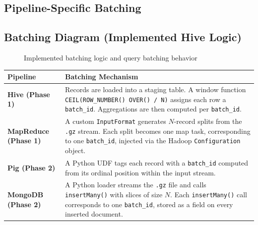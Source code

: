 \documentclass[12pt,a4paper]{article}
\begin{document}
\subsection{Pipeline-Specific Batching}
\subsection{Batching Diagram (Implemented Hive Logic)}
\begin{figure}[H]
\centering
{}
\caption{Implemented batching logic and query batching behavior}
\end{figure}

\begin{center}
\begin{tabularx}{\textwidth}{lX}
\toprule
\textbf{Pipeline} & \textbf{Batching Mechanism} \\
\midrule
\textbf{Hive (Phase 1)} & Records are loaded into a staging table. A window function \texttt{CEIL(ROW\_NUMBER() OVER() / N)} assigns each row a \texttt{batch\_id}. Aggregations are then computed per \texttt{batch\_id}. \\
\addlinespace
\textbf{MapReduce (Phase 1)} & A custom \texttt{InputFormat} generates $N$-record splits from the \texttt{.gz} stream. Each split becomes one map task, corresponding to one \texttt{batch\_id}, injected via the Hadoop \texttt{Configuration} object. \\
\addlinespace
\textbf{Pig (Phase 2)} & A Python UDF tags each record with a \texttt{batch\_id} computed from its ordinal position within the input stream. \\
\addlinespace
\textbf{MongoDB (Phase 2)} & A Python loader streams the \texttt{.gz} file and calls \texttt{insertMany()} with slices of size $N$. Each \texttt{insertMany()} call corresponds to one \texttt{batch\_id}, stored as a field on every inserted document. \\
\bottomrule
\end{tabularx}
\end{center}
\end{document}
